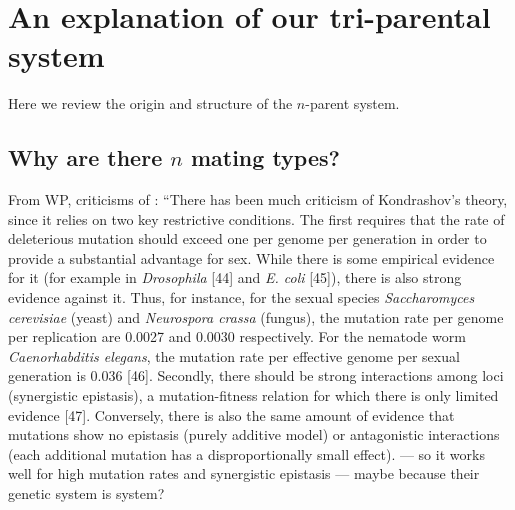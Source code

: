 

\section*{An explanation of our tri-parental system}

Here we review the origin and structure of the $n$-parent system.

\subsection*{Why are there $n$ mating types?}



From WP, criticisms of \cite{kondrashov_deleterious_1988}: ``There has been much criticism of Kondrashov's theory, since it relies on two key restrictive conditions. The first requires that the rate of deleterious mutation should exceed one per genome per generation in order to provide a substantial advantage for sex. While there is some empirical evidence for it (for example in \emph{Drosophila} [44] and \emph{E. coli} [45]), there is also strong evidence against it. Thus, for instance, for the sexual species \emph{Saccharomyces cerevisiae} (yeast) and \emph{Neurospora crassa} (fungus), the mutation rate per genome per replication are 0.0027 and 0.0030 respectively. For the nematode worm \emph{Caenorhabditis elegans}, the mutation rate per effective genome per sexual generation is 0.036 [46]. Secondly, there should be strong interactions among loci (synergistic epistasis), a mutation-fitness relation for which there is only limited evidence [47]. Conversely, there is also the same amount of evidence that mutations show no epistasis (purely additive model) or antagonistic interactions (each additional mutation has a disproportionally small effect). --- so it works well for high mutation rates and synergistic epistasis --- maybe because their genetic system is system?


